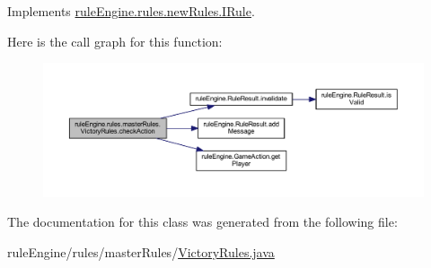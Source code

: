 Implements \mbox{\hyperlink{interfacerule_engine_1_1rules_1_1new_rules_1_1_i_rule_a72ce29a47d7a5fba75a09444a50a481e}{rule\+Engine.\+rules.\+new\+Rules.\+I\+Rule}}.

Here is the call graph for this function\+:
\nopagebreak
\begin{figure}[H]
\begin{center}
\leavevmode
\includegraphics[width=350pt]{classrule_engine_1_1rules_1_1master_rules_1_1_victory_rules_a9f52825deabf9b02fe2b879be5064ae7_cgraph}
\end{center}
\end{figure}


The documentation for this class was generated from the following file\+:\begin{DoxyCompactItemize}
\item 
rule\+Engine/rules/master\+Rules/\mbox{\hyperlink{_victory_rules_8java}{Victory\+Rules.\+java}}\end{DoxyCompactItemize}
